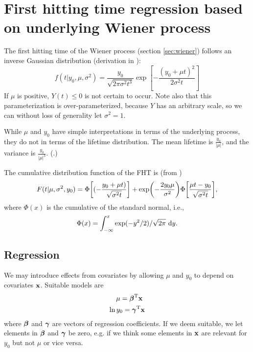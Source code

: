 \section{First hitting time regression based on underlying Wiener process}
The first hitting time of the Wiener process (section \ref{sec:wiener}) follows an inverse Gaussian distribution (derivation in \cite[23-29]{chhikara1988}):
\begin{equation}
\label{eq:fht-ig}
    f(t|y_0,\mu,\sigma^2)=\frac{y_0}{\sqrt{2\pi\sigma^2t^3}}\exp\left[-\frac{(y_0+\mu t)^2}{2\sigma^2t}\right]
\end{equation}
If $\mu$ is positive, $Y(t)\leq 0$ is not certain to occur. Note also that this parameterization is over-parameterized, because $Y$ has an arbitrary scale, so we can without loss of generality let $\sigma^2=1$.

While $\mu$ and $y_0$ have simple interpretations in terms of the underlying process, they do not in terms of the lifetime distribution. The mean lifetime is $\frac{y_0}{|\mu|}$, and the variance is $\frac{y_0}{|\mu|^3}$. (\cite[62]{caroni2017}.)

The cumulative distribution function of the FHT is (from \cite[7]{threg})
\begin{equation}\label{eq:cumulative}
    F(t|\mu,\sigma^2,y_0)=\Phi\sqb*{(-\frac{y_0+\mu t)}{\sqrt{\sigma^2t}}}+\exp\p*{-\frac{2y_0\mu}{\sigma^2}}\Phi\sqb*{\frac{\mu t-y_0}{\sqrt{\sigma^2t}}},
\end{equation}
where $\Phi(x)$ is the cumulative of the standard normal, i.e.,
\begin{equation}
    \Phi(x)=\int_{-\infty}^x\exp(-y^2/2)/\sqrt{2\pi}\text{~d}y.
\end{equation}

\subsection{Regression}
We may introduce effects from covariates by allowing $\mu$ and $y_0$ to depend on covariates $\mathbf{x}$. Suitable models are
\begin{align}\label{eq:coeffs}
\begin{split}
    \mu=\bbeta^\T\x \\
    \ln y_0=\bgamma^\T\x
\end{split}
\end{align}
where $\boldsymbol{\beta}$ and $\boldsymbol{\gamma}$ are vectors of regression coefficients. If we deem suitable, we let elements in $\boldsymbol{\beta}$ and $\boldsymbol{\gamma}$ be zero, e.g. if we think some elements in $\mathbf{x}$ are relevant for $y_0$ but not $\mu$ or vice versa.

